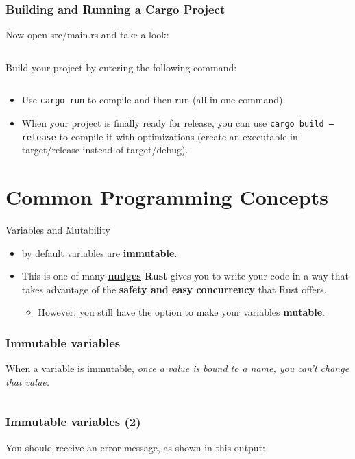 \documentclass{beamer}
\begin{document}
	\begin{frame}[fragile]
		\frametitle{Building and Running a Cargo Project}
		Now open src/main.rs and take a look:
		\inputminted{rust}{./code/hello-world-main.rs}
		
		Build your project by entering the following command:
		
		\inputminted{shell}{./code/hello-world-build.shell}
		
		\begin{itemize}
			\item Use \texttt{cargo run} to compile and then run (all in one command).
			\item When your project is finally ready for release, you can use \texttt{cargo build --release} to compile it with optimizations (create an executable in target/release instead of target/debug). 
		\end{itemize}
	\end{frame}
	
	\section{Common Programming Concepts}
	
	\begin{frame}{Variables and Mutability}
		\begin{itemize}
			\item by default variables are \textbf{immutable}. 
			\item This is one of many \textbf{\href{https://en.wikipedia.org/wiki/Nudge_theory}{\underline{nudges}} Rust}   gives you to write your code in a way that takes advantage of the \textbf{safety and easy concurrency }that Rust offers. 
			\begin{itemize}
				\item However, you still have the option to make your variables \textbf{mutable}. 
			\end{itemize}
		\end{itemize}
	\end{frame}
	
	\begin{frame}[fragile]
		\frametitle{Immutable variables}
		When a variable is immutable, \textit{once a value is bound to a name, you can’t change that value.}
		
		\inputminted{rust}{./code/immutable-variable.rs}
	\end{frame}
	
	\begin{frame}[fragile]
		\frametitle{Immutable variables (2)}
		You should receive an error message, as shown in this output:
		
		\inputminted{shell}{./code/immutable-variable.shell}
	\end{frame}
	
\end{document}
